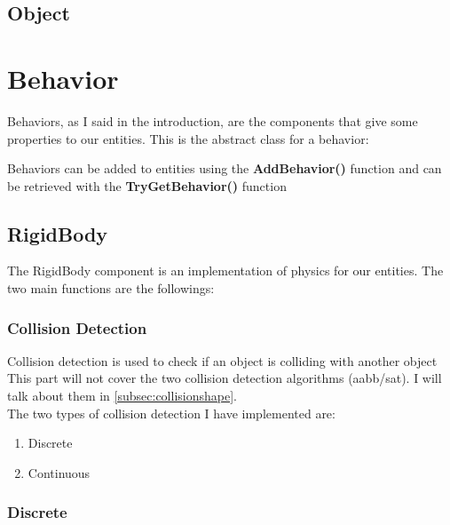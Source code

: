 \documentclass{article}
\begin{document}
    \newpage

    \subsection{Object}\label{subsec:object}

    \newpage

    \section{Behavior}\label{sec:behavior}

    Behaviors, as I said in the introduction, are the components that give some properties to our entities.
    This is the abstract class for a behavior:

    

    Behaviors can be added to entities using the \textbf{AddBehavior()} function and can be retrieved with the
    \textbf{TryGetBehavior()} function

    \newpage

    \subsection{RigidBody}\label{subsec:rigidbody}

    The RigidBody component is an implementation of physics for our entities.
    The two main functions are the followings:

    \subsubsection{Collision Detection}

    Collision detection is used to check if an object is colliding with another object
    This part will not cover the two collision detection algorithms (aabb/sat).
    I will talk about them in \ref{subsec:collisionshape}.\\
    The two types of collision detection I have implemented are:

    \begin{enumerate}
        \item Discrete
        \item Continuous
    \end{enumerate}

    \subsubsection{Discrete}
\end{document}
